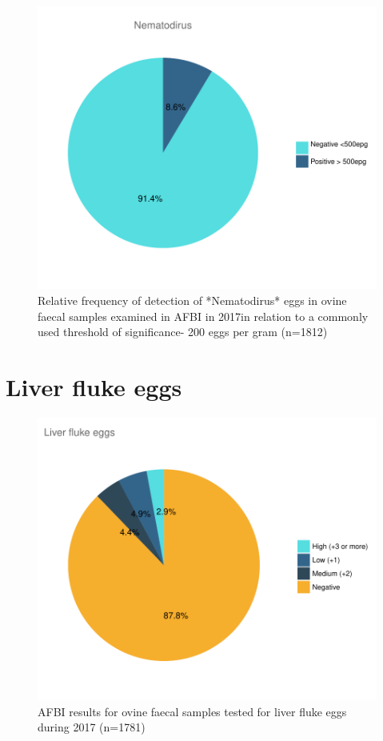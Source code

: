 \documentclass[]{book}
\begin{document}
\begin{figure}

{\centering \includegraphics{AFBI_files/figure-latex/unnamed-chunk-115-1} 

}

\caption{Relative frequency of detection of *Nematodirus* eggs in ovine faecal samples examined in AFBI in 2017in relation to a commonly used threshold of significance- 200 eggs per gram (n=1812)}\label{fig:unnamed-chunk-115}
\end{figure}

\section{Liver fluke eggs}\label{liver-fluke-eggs-1}

\begin{figure}

{\centering \includegraphics{AFBI_files/figure-latex/unnamed-chunk-117-1} 

}

\caption{AFBI results for ovine faecal samples tested for liver fluke eggs during 2017 (n=1781)}\label{fig:unnamed-chunk-117}
\end{figure}
\end{document}

